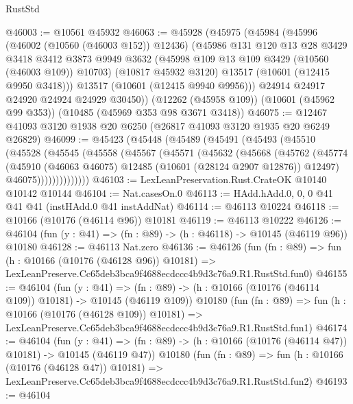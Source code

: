 \begin{lexlean}{RustStd}
\begin{coremodule}
@46003 := @10561 @45932
@46063 := @45928
    (@45975
      (@45984
        (@45996
          (@46002 (@10560 (@46003 @152)) @12436)
          (@45986
            @131
            @120
            @13
            @28
            @3429
            @3418
            @3412
            @3873
            @9949
            @3632
            (@45998 @109 @13 @109 @3429 (@10560 (@46003 @109)) @10703)
            (@10817 @45932 @3120)
            @13517
            (@10601 (@12415 @9950 @3418)))
          @13517
          (@10601 (@12415 @9940 @9956)))
        @24914
        @24917
        @24920
        @24924
        @24929
        @30450))
    (@12262 (@45958 @109))
    (@10601 (@45962 @99 @353))
    (@10485 (@45969 @353 @98 @3671 @3418))
@46075 := @12467 @41093 @3120 @1938 @20 @6250 (@26817 @41093 @3120 @1935 @20 @6249 @26829)
@46099 := @45423
    (@45448
      (@45489
        (@45491
          (@45493
            (@45510
              (@45528
                (@45545
                  (@45558
                    (@45567
                      (@45571
                        (@45632
                          (@45668
                            (@45762
                              (@45774
                                (@45910
                                  (@46063 @46075)
                                  @12485
                                  (@10601 (@28124 @2907 @12876))
                                  @12497)
                                @46075))))))))))))))
@46103 := LexLeanPreservation.Rust.CrateOK @10140 @10142 @10144
@46104 := Nat.casesOn.{0}
@46113 := HAdd.hAdd.{0, 0, 0} @41 @41 @41 (instHAdd.{0} @41 instAddNat)
@46114 := @46113 @10224
@46118 := @10166 (@10176 (@46114 @96)) @10181
@46119 := @46113 @10222
@46126 := @46104 (fun (y : @41) => (fn : @89) -> (h : @46118) -> @10145 (@46119 @96)) @10180
@46128 := @46113 Nat.zero
@46136 := @46126
    (fun (fn : @89) =>
    fun (h : @10166 (@10176 (@46128 @96)) @10181) =>
    LexLeanPreserve.Cc65deb3bca9f4688ecdccc4b9d3c76a9.R1.RustStd.fun0)
@46155 := @46104
    (fun (y : @41) =>
    (fn : @89) -> (h : @10166 (@10176 (@46114 @109)) @10181) -> @10145 (@46119 @109))
    @10180
    (fun (fn : @89) =>
    fun (h : @10166 (@10176 (@46128 @109)) @10181) =>
    LexLeanPreserve.Cc65deb3bca9f4688ecdccc4b9d3c76a9.R1.RustStd.fun1)
@46174 := @46104
    (fun (y : @41) =>
    (fn : @89) -> (h : @10166 (@10176 (@46114 @47)) @10181) -> @10145 (@46119 @47))
    @10180
    (fun (fn : @89) =>
    fun (h : @10166 (@10176 (@46128 @47)) @10181) =>
    LexLeanPreserve.Cc65deb3bca9f4688ecdccc4b9d3c76a9.R1.RustStd.fun2)
@46193 := @46104

\end{coremodule}
\end{lexlean}
